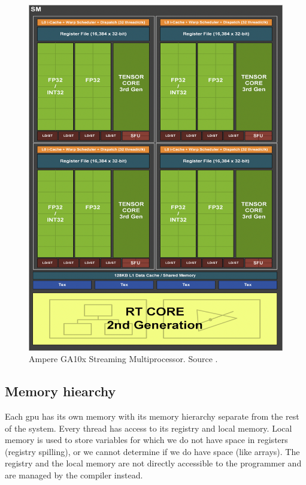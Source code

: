 \begin{figure}[H]
  \centering
  \includegraphics[width=\textwidth]{components/assets/ampere-sm.png}
  \caption{Ampere GA10x Streaming Multiprocessor. Source \cite{nvidiaampere}.}
  \label{figure:ampere-sm}
\end{figure}

\subsection{Memory hiearchy} \label{label:gpu:mem}

Each \acrshort{gpu} has its own memory with its memory hierarchy separate from the rest of the system. Every thread has access to its registry and local memory. Local memory is used to store variables for which we do not have space in registers (registry spilling), or we cannot determine if we do have space (like arrays). The registry and the local memory are not directly accessible to the programmer and are managed by the compiler instead.


